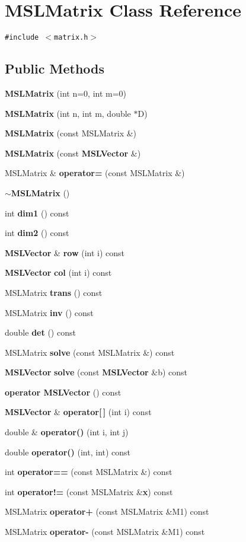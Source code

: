 \section{MSLMatrix  Class Reference}
\label{classMSLMatrix}
{\tt \#include $<$matrix.h$>$}

\subsection*{Public Methods}
\begin{CompactItemize}
\item 
{\bf MSLMatrix} (int n=0, int m=0)
\item 
{\bf MSLMatrix} (int n, int m, double $\ast$D)
\item 
{\bf MSLMatrix} (const MSLMatrix \&)
\item 
{\bf MSLMatrix} (const {\bf MSLVector} \&)
\item 
MSLMatrix \& {\bf operator=} (const MSLMatrix \&)
\item 
{\bf $\sim$MSLMatrix} ()
\item 
int {\bf dim1} () const
\item 
int {\bf dim2} () const
\item 
{\bf MSLVector} \& {\bf row} (int i) const
\item 
{\bf MSLVector} {\bf col} (int i) const
\item 
MSLMatrix {\bf trans} () const
\item 
MSLMatrix {\bf inv} () const
\item 
double {\bf det} () const
\item 
MSLMatrix {\bf solve} (const MSLMatrix \&) const
\item 
{\bf MSLVector} {\bf solve} (const {\bf MSLVector} \&b) const
\item 
{\bf operator MSLVector} () const
\item 
{\bf MSLVector} \& {\bf operator[$\,$]} (int i) const
\item 
double \& {\bf operator()} (int i, int j)
\item 
double {\bf operator()} (int, int) const
\item 
int {\bf operator==} (const MSLMatrix \&) const
\item 
int {\bf operator!=} (const MSLMatrix \&{\bf x}) const
\item 
MSLMatrix {\bf operator+} (const MSLMatrix \&M1) const
\item 
MSLMatrix {\bf operator-} (const MSLMatrix \&M1) const

\end{CompactItemize}
